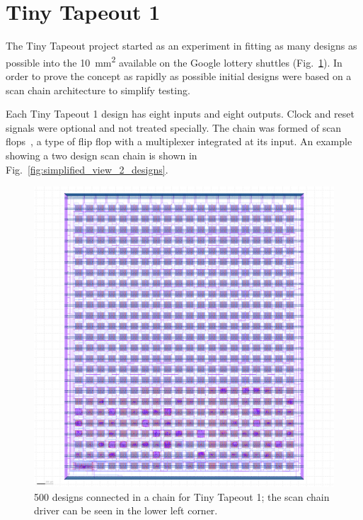 \section{Tiny Tapeout 1}
\label{sec:tinytapeout1}

The Tiny Tapeout project started as an experiment in fitting as many designs as possible into the \qty{10}{\milli\meter\squared} available on the Google lottery shuttles (Fig.~\ref{fig:500_designs_chain_TT01}).
In order to prove the concept as rapidly as possible initial designs were based on a scan chain architecture to simplify testing.

Each Tiny Tapeout 1 design has eight inputs and eight outputs.
Clock and reset signals were optional and not treated specially. The chain was formed of scan flops~\cite{skywaterpdk}, a type of flip flop with a multiplexer integrated at its input. An example showing a two design scan chain is shown in Fig.~\ref{fig:simplified_view_2_designs}.

\begin{figure}[!t]
\centering
\includegraphics[width=1\columnwidth]{./Figs/tt01_whole_die.png}
\caption{500 designs connected in a chain for Tiny Tapeout 1; the scan chain driver can be seen in the lower left corner.}
\label{fig:500_designs_chain_TT01}
\end{figure}


